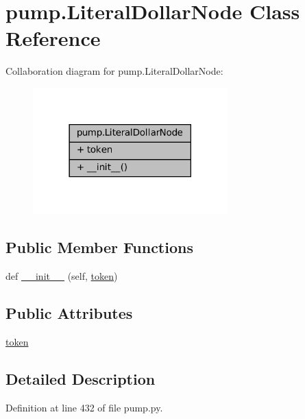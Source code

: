 \hypertarget{classpump_1_1LiteralDollarNode}{}\section{pump.\+Literal\+Dollar\+Node Class Reference}
\label{classpump_1_1LiteralDollarNode}


Collaboration diagram for pump.\+Literal\+Dollar\+Node\+:
\nopagebreak
\begin{figure}[H]
\begin{center}
\leavevmode
\includegraphics[width=213pt]{classpump_1_1LiteralDollarNode__coll__graph}
\end{center}
\end{figure}
\subsection*{Public Member Functions}
\begin{DoxyCompactItemize}
\item 
def \hyperlink{classpump_1_1LiteralDollarNode_a181cccad8a48f7dfdd0716e427897e0b}{\+\_\+\+\_\+init\+\_\+\+\_\+} (self, \hyperlink{classpump_1_1LiteralDollarNode_ab4c6e209635b8868bcdf0fe8053431c6}{token})
\end{DoxyCompactItemize}
\subsection*{Public Attributes}
\begin{DoxyCompactItemize}
\item 
\hyperlink{classpump_1_1LiteralDollarNode_ab4c6e209635b8868bcdf0fe8053431c6}{token}
\end{DoxyCompactItemize}


\subsection{Detailed Description}


Definition at line 432 of file pump.\+py.



